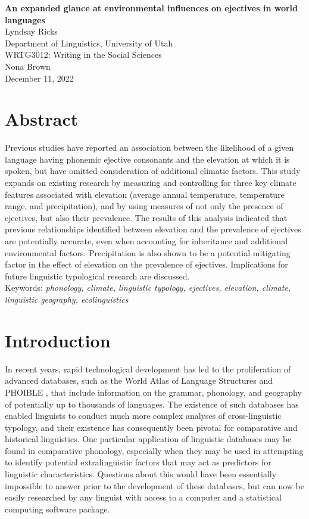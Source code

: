 \documentclass{article}
\begin{document}
\begin{titlepage}
	\centering
	\vspace*{0.2\textheight}
	\textbf{An expanded glance at environmental influences on ejectives in world languages}\\
	Lyndsay Ricks\\
	Department of Linguistics, University of Utah\\
	WRTG3012: Writing in the Social Sciences\\
	Nona Brown\\
	December 11, 2022
\end{titlepage}
\section{Abstract}

{\parindent0pt Previous studies have reported an association between the likelihood of a given language having phonemic ejective consonants and the elevation at which it is spoken, but have omitted consideration of additional climatic factors. This study expands on existing research by measuring and controlling for three key climate features associated with elevation (average annual temperature, temperature range, and precipitation), and by using measures of not only the presence of ejectives, but also their prevalence. The results of this analysis indicated that previous relationships identified between elevation and the prevalence of ejectives are potentially accurate, even when accounting for inheritance and additional environmental factors. Precipitation is also shown to be a potential mitigating factor in the effect of elevation on the prevalence of ejectives. Implications for future linguistic typological research are discussed.} \\

{\parindent0pt Keywords: \emph{phonology, climate, linguistic typology, ejectives, elevation, climate, linguistic geography, ecolinguistics}}

\pagebreak

\section{Introduction}
In recent years, rapid technological development has led to the proliferation of advanced databases, such as the World Atlas of Language Structures \parencite{wals} and PHOIBLE \parencite{phoible}, that include information on the grammar, phonology, and geography of potentially up to thousands of languages. The existence of such databases has enabled linguists to conduct much more complex analyses of cross-linguistic typology, and their existence has consequently been pivotal for comparative and historical linguistics. One particular application of linguistic databases may be found in comparative phonology, especially when they may be used in attempting to identify potential extralinguistic factors that may act as predictors for linguistic characteristics. Questions about this would have been essentially impossible to answer prior to the development of these databases, but can now be easily researched by any linguist with access to a computer and a statistical computing software package. 
\end{document}
